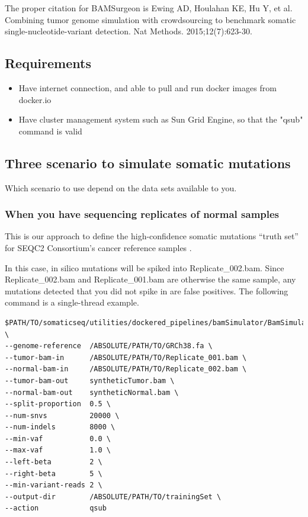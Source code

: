 \documentclass[10pt,letterpaper]{article}
\begin{document}
\begin{sloppypar}
The proper citation for BAMSurgeon is Ewing AD, Houlahan KE, Hu Y, et al. Combining tumor genome simulation with crowdsourcing to benchmark somatic single-nucleotide-variant detection. Nat Methods. 2015;12(7):623-30.


\subsection{Requirements}

\begin{itemize}

  \item Have internet connection, and able to pull and run docker images from docker.io

  \item Have cluster management system such as Sun Grid Engine, so that the "qsub" command is valid

\end{itemize}





\subsection{Three scenario to simulate somatic mutations}

Which scenario to use depend on the data sets available to you.


\subsubsection{When you have sequencing replicates of normal samples}

This is our approach to define the high-confidence somatic mutations ``truth set'' for SEQC2 Consortium's cancer reference samples \cite{2021_Fang_Nat_Biotechnol}.

In this case, in silico mutations will be spiked into Replicate\_002.bam. Since Replicate\_002.bam and Replicate\_001.bam are otherwise the same sample, any mutations detected that you did not spike in are false positives. The following command is a single-thread example.


\begin{lstlisting}
$PATH/TO/somaticseq/utilities/dockered_pipelines/bamSimulator/BamSimulator_singleThread.sh \
--genome-reference  /ABSOLUTE/PATH/TO/GRCh38.fa \
--tumor-bam-in      /ABSOLUTE/PATH/TO/Replicate_001.bam \
--normal-bam-in     /ABSOLUTE/PATH/TO/Replicate_002.bam \
--tumor-bam-out     syntheticTumor.bam \
--normal-bam-out    syntheticNormal.bam \
--split-proportion  0.5 \
--num-snvs          20000 \
--num-indels        8000 \
--min-vaf           0.0 \
--max-vaf           1.0 \
--left-beta         2 \
--right-beta        5 \
--min-variant-reads 2 \
--output-dir        /ABSOLUTE/PATH/TO/trainingSet \
--action            qsub
\end{lstlisting}




\end{sloppypar}
\end{document}
